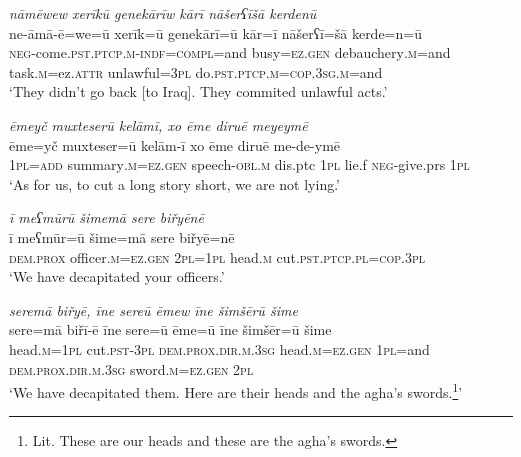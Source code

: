 \ea \label{BP.94}
\textit{nāmēwew xerīkū genekārīw kārī nāšerʕīšā kerdenū} \\ 
\gll ne-āmā-ē=we=ū xerīk=ū genekārī=ū kār=ī nāšerʕī=šā kerde=n=ū \\ 
 \textsc{neg-}come\textsc{.pst}\textsc{.ptcp}\textsc{.m}\textsc{-indf}\textsc{=compl}=and busy\textsc{=ez.gen} debauchery\textsc{.m}=and task\textsc{.m}=ez.\textsc{attr} unlawful\textsc{=3pl} do\textsc{.pst}\textsc{.ptcp}\textsc{.m}\textsc{=cop}\textsc{.3sg}\textsc{.m}=and \\ 
\glt `They didn’t go back [to Iraq]. They commited unlawful acts.'
\z 
 
\ea \label{BP.95}
\textit{ēmeyč muxteserū kelāmī, xo ēme diruē meyeymē} \\ 
\gll ēme=yč muxteser=ū kelām-ī xo ēme diruē me-de-ymē \\ 
 \textsc{1pl}\textsc{=add} summary\textsc{.m}\textsc{=ez.gen} speech\textsc{-obl}\textsc{.m} dis.ptc \textsc{1pl} lie.f \textsc{neg-}give.prs \textsc{1pl} \\ 
\glt `As for us, to cut a long story short, we are not lying.'
\z 
 
\ea \label{BP.96}
\textit{ī meʕmūrū šimemā sere biřyēnē} \\ 
\gll ī meʕmūr=ū šime=mā sere biřyē=nē \\ 
 \textsc{dem.prox} officer\textsc{.m}\textsc{=ez.gen} \textsc{2pl}\textsc{=\textsc{1pl}} head\textsc{.m} cut\textsc{.pst}\textsc{.ptcp}\textsc{.pl}\textsc{=cop}\textsc{.3pl} \\ 
\glt `We have decapitated your officers.'
\z 
 
\ea \label{BP.97}
\textit{seremā biřyē, īne sereū ēmew īne šimšērū šime} \\ 
\gll sere=mā biřī-ē īne sere=ū ēme=ū īne šimšēr=ū šime \\ 
 head\textsc{.m}\textsc{=\textsc{1pl}} cut\textsc{.pst}\textsc{-3pl} \textsc{dem.prox}\textsc{.dir}\textsc{.m}\textsc{.3sg} head\textsc{.m}\textsc{=ez.gen} \textsc{1pl}=and \textsc{dem.prox}\textsc{.dir}\textsc{.m}\textsc{.3sg} sword\textsc{.m}\textsc{=ez.gen} \textsc{2pl} \\ 
\glt `We have decapitated them. Here are their heads and the agha’s swords.\footnote{Lit. These are our heads and these are the agha’s swords.}'
\z 
 
